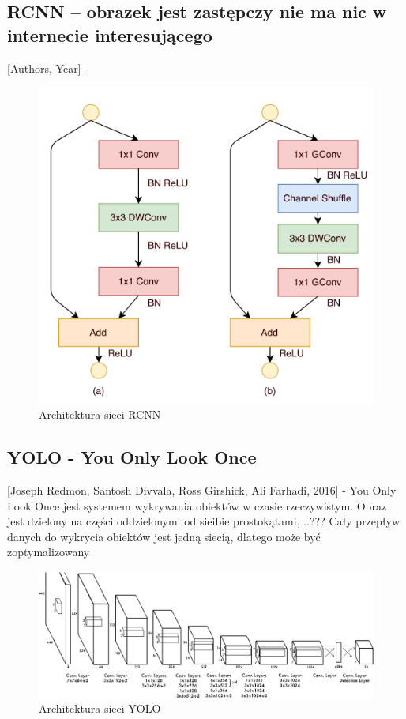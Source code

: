 \documentclass[12pt,a4paper,twoside,titlepage,openright]{book}
\begin{document}
\subsection{RCNN -- obrazek jest zastępczy nie ma nic w internecie interesującego}
[Authors, Year] - \cite{DBLP:journals/corr/RenHG015}
\begin{figure}[h]
	\centering
			\includegraphics[resolution=120]{ResNeXt.png}
		\caption{Architektura sieci RCNN}
\end{figure}

\subsection{YOLO - You Only Look Once }
[Joseph Redmon, Santosh Divvala, Ross Girshick, Ali Farhadi, 2016] - You Only Look Once jest systemem wykrywania obiektów w czasie rzeczywistym. Obraz jest dzielony na części oddzielonymi od sieibie prostokątami, ..???
Cały przepływ danych do wykrycia obiektów jest jedną siecią, dlatego może być zoptymalizowany \cite{DBLP:journals/corr/RedmonDGF15}
\begin{figure}[h]
	\centering
			\includegraphics[resolution=120]{YOLO.png}
		\caption{Architektura sieci YOLO}
\end{figure}
\end{document}
